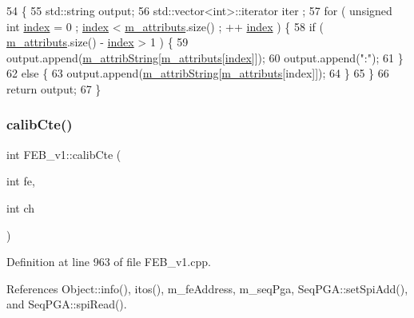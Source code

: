 \begin{DoxyCode}
54                             \{
55   std::string output;
56   std::vector<int>::iterator iter ;
57   \textcolor{keywordflow}{for} ( \textcolor{keywordtype}{unsigned} \textcolor{keywordtype}{int} \hyperlink{namespaceimages_a54407fd574970b3178647ae096321a57}{index} = 0 ; \hyperlink{namespaceimages_a54407fd574970b3178647ae096321a57}{index} < \hyperlink{classAttrib_ac4bd58a0cc6b38a3b711d609a3d3aacc}{m\_attributs}.size() ; ++
      \hyperlink{namespaceimages_a54407fd574970b3178647ae096321a57}{index} ) \{
58     \textcolor{keywordflow}{if} ( \hyperlink{classAttrib_ac4bd58a0cc6b38a3b711d609a3d3aacc}{m\_attributs}.size() - \hyperlink{namespaceimages_a54407fd574970b3178647ae096321a57}{index} > 1 ) \{
59       output.append(\hyperlink{classAttrib_a3414521d7a82476e874b25a5407b5e63}{m\_attribString}[\hyperlink{classAttrib_ac4bd58a0cc6b38a3b711d609a3d3aacc}{m\_attributs}[\hyperlink{namespaceimages_a54407fd574970b3178647ae096321a57}{index}]]);
60       output.append(\textcolor{stringliteral}{":"});
61     \}
62     \textcolor{keywordflow}{else} \{
63       output.append(\hyperlink{classAttrib_a3414521d7a82476e874b25a5407b5e63}{m\_attribString}[\hyperlink{classAttrib_ac4bd58a0cc6b38a3b711d609a3d3aacc}{m\_attributs}[index]]);
64     \}
65   \}
66   \textcolor{keywordflow}{return} output;
67 \}
\end{DoxyCode}
\mbox{\label{classFEB__v1_ad3893c8062c75d1f9695c196c95703c7}} 
\subsubsection{\texorpdfstring{calib\+Cte()}{calibCte()}}
{\footnotesize\ttfamily int F\+E\+B\+\_\+v1\+::calib\+Cte (\begin{DoxyParamCaption}\item[{int}]{fe,  }\item[{int}]{ch }\end{DoxyParamCaption})}



Definition at line 963 of file F\+E\+B\+\_\+v1.\+cpp.



References Object\+::info(), itos(), m\+\_\+fe\+Address, m\+\_\+seq\+Pga, Seq\+P\+G\+A\+::set\+Spi\+Add(), and Seq\+P\+G\+A\+::spi\+Read().



